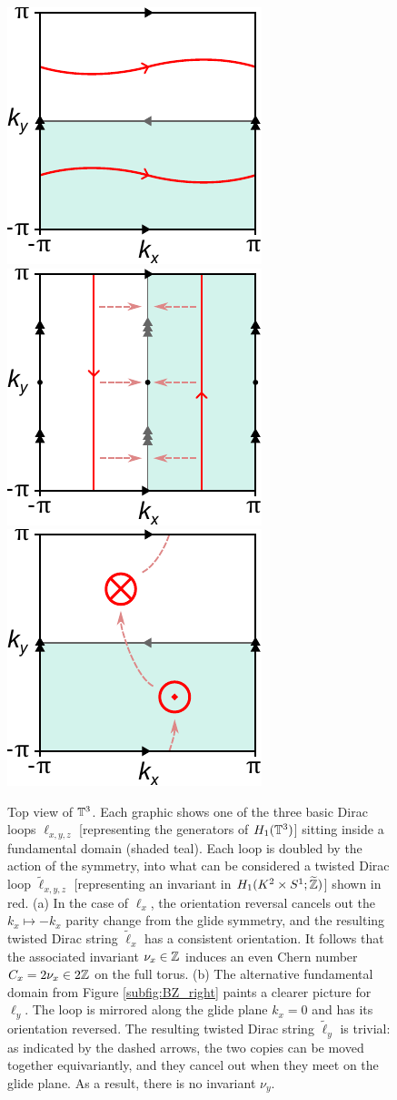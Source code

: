 \begin{figure}[htb!]
	\centering
	 {\includegraphics[width=.3\textwidth]{Images/Z_invariant}}
	\hfil
	 {\includegraphics[width=.3\textwidth]{Images/0_invariant}}
	\hfil
	 {\includegraphics[width=.3\textwidth]{Images/Z2_invariant}}
	\caption{Top view of $\mathbb{T}^3$. Each graphic shows one of the three basic Dirac loops $\ell_{x,y,z}$ [representing the generators of $H_1(\mathbb{T}^3)$] sitting inside a fundamental domain (shaded teal). Each loop is doubled by the action of the symmetry, into what can be considered a twisted Dirac loop $\tilde{\ell}_{x,y,z}$ [representing an invariant in $H_1(K^2\times S^1;\widetilde{\mathbb{Z}})$] shown in red. (a) In the case of $\ell_x$, the orientation reversal cancels out the $k_x \mapsto -k_x$ parity change from the glide symmetry, and the resulting twisted Dirac string $\tilde{\ell}_x$ has a consistent orientation. It follows that the associated invariant $\nu_x\in\mathbb{Z}$ induces an even Chern number $C_x = 2\nu_x\in 2\mathbb{Z}$ on the full torus.
		(b) The alternative fundamental domain from Figure \ref{subfig:BZ_right} paints a clearer picture for $\ell_y$. The loop is mirrored along the glide plane $k_x=0$ and has its orientation reversed. The resulting twisted Dirac string $\tilde{\ell}_y$ is trivial: as indicated by the dashed arrows, the two copies can be moved together equivariantly, and they cancel out when they meet on the glide plane. As a result, there is no invariant $\nu_y$.
}
\end{figure}
